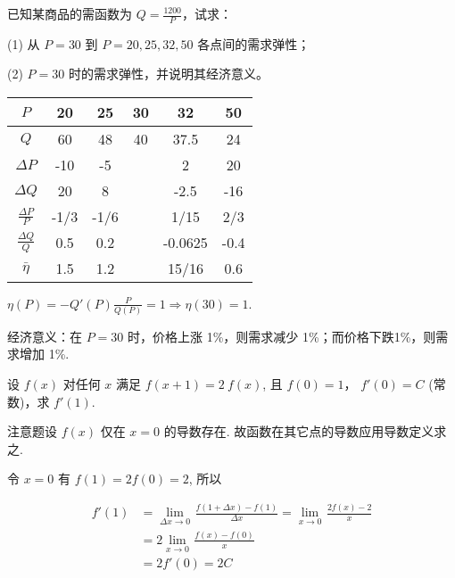 \begin{problem}
已知某商品的需函数为
$\displaystyle Q = \frac{1200}{P}$，试求：

(1) 从 $P = 30$ 到 $P = 20,25,32,50$ 各点间的需求弹性；

(2) $P = 30$ 时的需求弹性，并说明其经济意义。

\begin{solution}
	\begin{table}[htbp]
		\begin{center}
		\begin{tabular}{|c|c|c|c|c|c|}
			\hline
			$P$ & 20 & 25 & 30 & 32 & 50 \\
			\hline
			$Q$ & 60 & 48 & 40 & 37.5& 24\\
			\hline
			$\Delta P$ & -10& -5 & & 2& 20\\
			\hline
			$\Delta Q$ & 20 & 8 & &-2.5 &-16\\
			\hline
			$\displaystyle \frac{\Delta P}{P}$& -1/3 & -1/6 & & 1/15& 2/3\\
			\hline
			$\displaystyle \frac{\Delta Q}{Q}$ & 0.5 & 0.2 & & -0.0625& -0.4\\
			\hline
			$\bar{\eta}$ & 1.5 & 1.2 & & 15/16 & 0.6\\
			\hline 
		\end{tabular}
\end{center}
	\end{table}
$\displaystyle \eta(P) = - Q'(P)\frac{P}{Q(P)} = 1 \Rightarrow \eta(30) = 1.$

经济意义：在 $P = 30$ 时，价格上涨 1\%，则需求减少
1\%；而价格下跌1\%，则需求增加 1\%.
\end{solution}




\end{problem}

\begin{problem}
	设 $f\left( x \right)$ 对任何 $x$ 满足
	$f\left( x + 1 \right) = 2\ f(x)$, 且 $f\left( 0 \right) = 1$，
	$f'(0) = C$ (常数)，求 $f'(1)$.

\begin{solution}
注意题设 $f\left( x \right)$ 仅在 $x = 0$ 的导数存在. 故函数在其它点的导数应用导数定义求之.

令 $x = 0$ 有 $f(1) = 2f\left( 0 \right) = 2$, 所以

\begin{equation*}
\begin{split}
f'(1) &= \lim_{\Delta x \rightarrow 0}\mspace{2mu}\frac{f(1 + \Delta x) - f(1)}{\Delta x} = \lim_{x \rightarrow 0}\mspace{2mu}\frac{2f(x) - 2}{x} \\
&= 2\lim_{x \rightarrow 0}\mspace{2mu}\frac{f(x) - f(0)}{x} \\
&= 2f'(0) = 2C \\
\end{split}
\end{equation*}
\end{solution}


\end{problem}          


